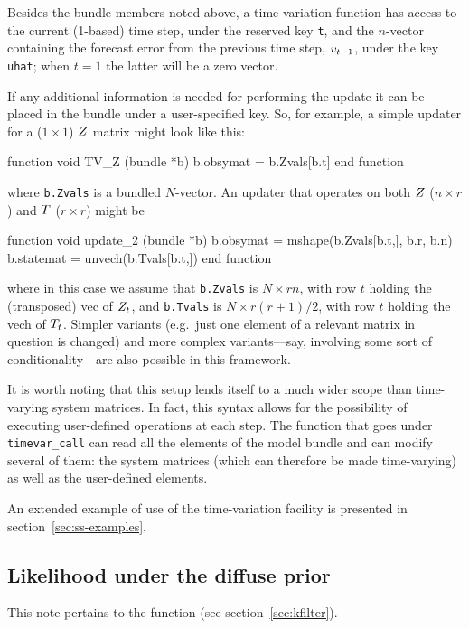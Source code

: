 Besides the bundle members noted above, a time variation function has
access to the current (1-based) time step, under the reserved key
\texttt{t}, and the $n$-vector containing the forecast error from the
previous time step, $v_{t-1}$, under the key \texttt{uhat};
when $t=1$ the latter will be a zero vector.

If any additional information is needed for performing the update it
can be placed in the bundle under a user-specified key.  So, for
example, a simple updater for a ($1 \times 1$) $Z$ matrix might
look like this:
%
\begin{code}
function void TV_Z (bundle *b)
    b.obsymat = b.Zvals[b.t]
end function
\end{code}
%
where \texttt{b.Zvals} is a bundled $N$-vector. An updater that
operates on both $Z$ ($n \times r$) and $T$ ($r \times
r$) might be
%
\begin{code}
function void update_2 (bundle *b)
    b.obsymat = mshape(b.Zvals[b.t,], b.r, b.n)
    b.statemat = unvech(b.Tvals[b.t,])
end function
\end{code}
%
where in this case we assume that \texttt{b.Zvals} is $N \times rn$,
with row $t$ holding the (transposed) vec of $Z_t$, and
\texttt{b.Tvals} is $N \times r(r+1)/2$, with row $t$ holding the vech
of $T_t$. Simpler variants (e.g.\ just one element of a
relevant matrix in question is changed) and more complex
variants---say, involving some sort of conditionality---are also
possible in this framework.

It is worth noting that this setup lends itself to a much wider scope
than time-varying system matrices. In fact, this syntax allows for the
possibility of executing user-defined operations at each step. The
function that goes under \texttt{timevar\_call} can read all the
elements of the model bundle and can modify several of them: the
system matrices (which can therefore be made time-varying) as well as
the user-defined elements.

An extended example of use of the time-variation facility is presented
in section~\ref{sec:ss-examples}.

\subsection{Likelihood under the diffuse prior}
\label{sec:lldiffuse}

This note pertains to the  function (see
section~\ref{sec:kfilter}).

